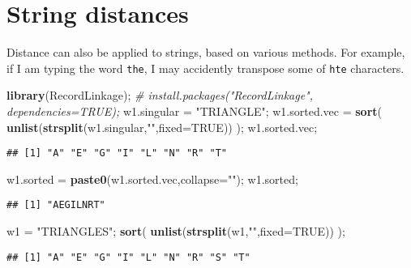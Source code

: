 \documentclass[
]{article}
\newenvironment{Shaded}{\begin{snugshade}}{\end{snugshade}}
\newcommand{\CommentTok}[1]{\textcolor[rgb]{0.56,0.35,0.01}{\textit{#1}}}
\newcommand{\DataTypeTok}[1]{\textcolor[rgb]{0.13,0.29,0.53}{#1}}
\newcommand{\KeywordTok}[1]{\textcolor[rgb]{0.13,0.29,0.53}{\textbf{#1}}}
\newcommand{\NormalTok}[1]{#1}
\newcommand{\OtherTok}[1]{\textcolor[rgb]{0.56,0.35,0.01}{#1}}
\newcommand{\StringTok}[1]{\textcolor[rgb]{0.31,0.60,0.02}{#1}}
\begin{document}
\hypertarget{string-distances}{%
\section{String distances}\label{string-distances}}

Distance can also be applied to strings, based on various methods. For
example, if I am typing the word \texttt{the}, I may accidently
transpose some of \texttt{hte} characters.

\begin{Shaded}
\begin{Highlighting}[]
\KeywordTok{library}\NormalTok{(RecordLinkage); }\CommentTok{\# install.packages("RecordLinkage", dependencies=TRUE);}
\NormalTok{w1.singular =}\StringTok{ "TRIANGLE"}\NormalTok{;     }
\NormalTok{w1.sorted.vec =}\StringTok{ }\KeywordTok{sort}\NormalTok{( }\KeywordTok{unlist}\NormalTok{(}\KeywordTok{strsplit}\NormalTok{(w1.singular,}\StringTok{""}\NormalTok{,}\DataTypeTok{fixed=}\OtherTok{TRUE}\NormalTok{)) );}
\NormalTok{w1.sorted.vec;}
\end{Highlighting}
\end{Shaded}

\begin{verbatim}
## [1] "A" "E" "G" "I" "L" "N" "R" "T"
\end{verbatim}

\begin{Shaded}
\begin{Highlighting}[]
\NormalTok{w1.sorted =}\StringTok{ }\KeywordTok{paste0}\NormalTok{(w1.sorted.vec,}\DataTypeTok{collapse=}\StringTok{""}\NormalTok{);}
\NormalTok{w1.sorted;}
\end{Highlighting}
\end{Shaded}

\begin{verbatim}
## [1] "AEGILNRT"
\end{verbatim}

\begin{Shaded}
\begin{Highlighting}[]
\NormalTok{w1 =}\StringTok{ "TRIANGLES"}\NormalTok{;             }\KeywordTok{sort}\NormalTok{( }\KeywordTok{unlist}\NormalTok{(}\KeywordTok{strsplit}\NormalTok{(w1,}\StringTok{""}\NormalTok{,}\DataTypeTok{fixed=}\OtherTok{TRUE}\NormalTok{)) );}
\end{Highlighting}
\end{Shaded}

\begin{verbatim}
## [1] "A" "E" "G" "I" "L" "N" "R" "S" "T"
\end{verbatim}
\end{document}
